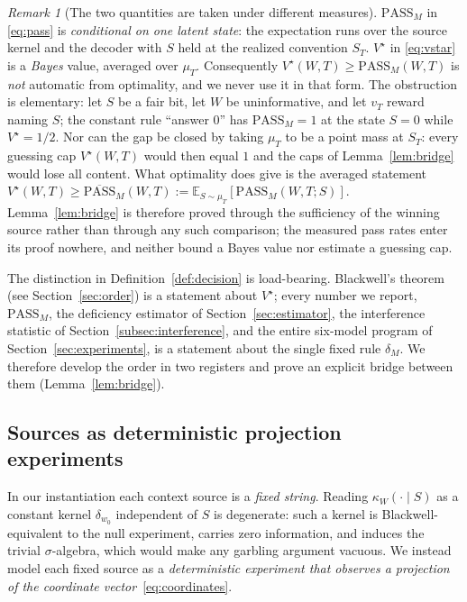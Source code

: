 \documentclass[11pt]{article}
\theoremstyle{plain}
\theoremstyle{definition}
\theoremstyle{remark}
\newtheorem{remark}{Remark}
\newcommand{\PASS}{\mathrm{PASS}}
\begin{document}
\begin{remark}[The two quantities are taken under different measures]
\label{rem:measures}
$\PASS_M$ in \eqref{eq:pass} is \emph{conditional on one latent state}: the expectation runs over
the source kernel and the decoder with $S$ held at the realized convention $S_T$. $V^\star$ in
\eqref{eq:vstar} is a \emph{Bayes} value, averaged over $\mu_T$. Consequently
$V^\star(W,T)\ge \PASS_M(W,T)$ is \emph{not} automatic from optimality, and we never use it in
that form. The obstruction is elementary: let $S$ be a fair bit, let $W$ be uninformative, and let
$v_T$ reward naming $S$; the constant rule ``answer $0$'' has $\PASS_M=1$ at the state $S=0$ while
$V^\star=1/2$. Nor can the gap be closed by taking $\mu_T$ to be a point mass at $S_T$: every
guessing cap $V^\star(W,T)$ would then equal $1$ and the caps of Lemma~\ref{lem:bridge} would lose
all content. What optimality does give is the averaged statement $V^\star(W,T) \ge
\overline{\PASS}_M(W,T) := \mathbb E_{S\sim\mu_T}[\PASS_M(W,T;S)]$. Lemma~\ref{lem:bridge} is
therefore proved through the sufficiency of the winning source rather than through any such
comparison; the measured pass rates enter its proof nowhere, and neither bound a Bayes value nor
estimate a guessing cap.
\end{remark}

The distinction in Definition~\ref{def:decision} is load-bearing. Blackwell's theorem
(see Section~\ref{sec:order}) is a statement about $V^\star$; every number we report, $\PASS_M$, the
deficiency estimator of Section~\ref{sec:estimator}, the interference statistic of
Section~\ref{subsec:interference}, and the entire six-model program of Section~\ref{sec:experiments}, is a
statement about the single fixed rule $\delta_M$. We therefore develop the order in two
registers and prove an explicit bridge between them (Lemma~\ref{lem:bridge}).

\subsection{Sources as deterministic projection experiments}
\label{subsec:sources}

In our instantiation each context source is a \emph{fixed string}. Reading $\kappa_W(\cdot\mid S)$
as a constant kernel $\delta_{w_0}$ independent of $S$ is degenerate: such a kernel is
Blackwell-equivalent to the null experiment, carries zero information, and induces the trivial
$\sigma$-algebra, which would make any garbling argument vacuous. We instead model each fixed
source as a \emph{deterministic experiment that observes a projection of the coordinate
vector}~\eqref{eq:coordinates}.
\end{document}
